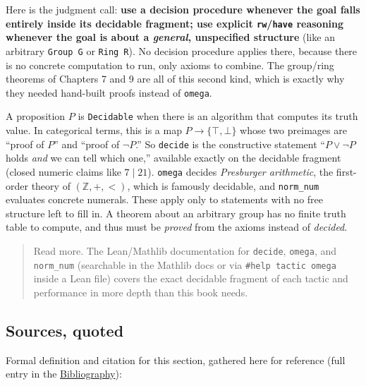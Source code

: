 Here is the judgment call: \textbf{use a decision procedure whenever the goal falls entirely inside its decidable fragment; use explicit \texttt{rw}/\texttt{have} reasoning whenever the goal is about a \emph{general}, unspecified structure} (like an arbitrary \texttt{Group G} or \texttt{Ring R}). No decision procedure applies there, because there is no concrete computation to run, only axioms to combine. The group/ring theorems of Chapters 7 and 9 are all of this second kind, which is exactly why they needed hand-built proofs instead of \texttt{omega}.

\begin{mathreading}

A proposition \(P\) is \texttt{Decidable} when there is an algorithm that computes its truth value. In categorical terms, this is a map \(P \to \{\top, \bot\}\) whose two preimages are ``proof of \(P\)'' and ``proof of \(\neg P\).'' So \texttt{decide} is the constructive statement ``\(P \vee \neg P\) holds \emph{and} we can tell which one,'' available exactly on the decidable fragment (closed numeric claims like \(7 \mid 21\)). \texttt{omega} decides \emph{Presburger arithmetic}, the first-order theory of \((\mathbb{Z}, +, <)\), which is famously decidable, and \texttt{norm\_\allowbreak{}num} evaluates concrete numerals. These apply only to statements with no free structure left to fill in. A theorem about an arbitrary group has no finite truth table to compute, and thus must be \emph{proved} from the axioms instead of \emph{decided}.

\end{mathreading}

\begin{quote}
Read more. The Lean/Mathlib documentation for \texttt{decide}, \texttt{omega}, and \texttt{norm\_\allowbreak{}num} (searchable in the Mathlib docs or via \texttt{\#help tactic omega} inside a Lean file) covers the exact decidable fragment of each tactic and performance in more depth than this book needs.
\end{quote}

\subsection{Sources, quoted}\label{sec:12-working-efficiently:02-decision-procedures:2}

Formal definition and citation for this section, gathered here for reference (full entry in the \hyperref[sec:root:bibliography:1]{Bibliography}):

